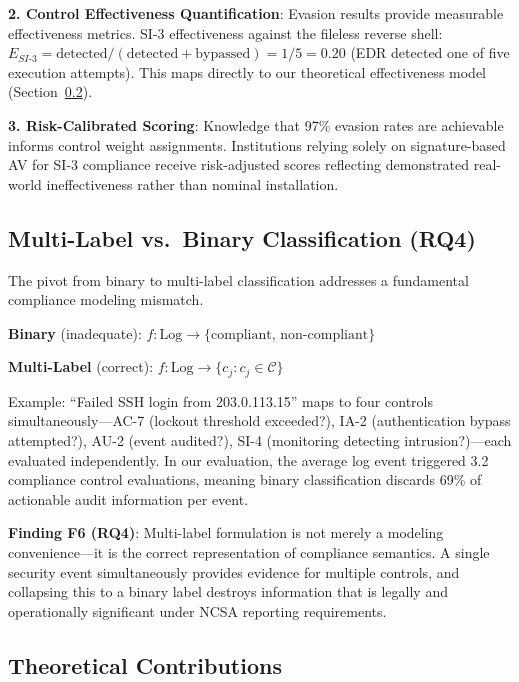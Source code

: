 \documentclass[futureinternet,article,submit,pdftex,moreauthors]{Definitions/mdpi}
\begin{document}
\textbf{2. Control Effectiveness Quantification}: Evasion results provide measurable
effectiveness metrics. SI-3 effectiveness against the fileless reverse shell:
$E_{SI\text{-}3} = \text{detected} / (\text{detected} + \text{bypassed}) = 1/5 = 0.20$
(EDR detected one of five execution attempts). This maps directly to our theoretical
effectiveness model (Section~\ref{sec:theory}).

\textbf{3. Risk-Calibrated Scoring}: Knowledge that 97\% evasion rates are
achievable~\cite{reverse_shell_paper} informs control weight assignments. Institutions relying
solely on signature-based AV for SI-3 compliance receive risk-adjusted scores reflecting
demonstrated real-world ineffectiveness rather than nominal installation.

\subsection{Multi-Label vs.\ Binary Classification (RQ4)}

The pivot from binary to multi-label classification addresses a fundamental compliance modeling
mismatch.

\textbf{Binary} (inadequate): $f\colon \text{Log} \to \{\text{compliant},\, \text{non-compliant}\}$

\textbf{Multi-Label} (correct): $f\colon \text{Log} \to \{c_j : c_j \in \mathcal{C}\}$

Example: ``Failed SSH login from 203.0.113.15'' maps to four controls
simultaneously---AC-7 (lockout threshold exceeded?), IA-2 (authentication bypass attempted?),
AU-2 (event audited?), SI-4 (monitoring detecting intrusion?)---each evaluated independently.
In our evaluation, the average log event triggered 3.2 compliance control evaluations, meaning
binary classification discards 69\% of actionable audit information per event.

\textbf{Finding F6 (RQ4)}: Multi-label formulation is not merely a modeling convenience---it
is the correct representation of compliance semantics. A single security event simultaneously
provides evidence for multiple controls, and collapsing this to a binary label destroys
information that is legally and operationally significant under NCSA reporting requirements.

\subsection{Theoretical Contributions}
\label{sec:theory}
\end{document}
